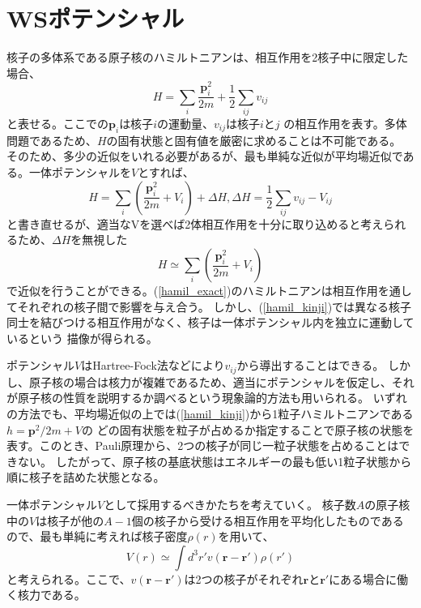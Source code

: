 \documentclass[a4paper,11pt]{jsreport}
\begin{document}
  \section{WSポテンシャル}
  核子の多体系である原子核のハミルトニアンは、相互作用を2核子中に限定した場合、
  \begin{equation}
    H=\sum_{i}\frac{\bm{p}_i^2}{2m} + \frac{1}{2}\sum_{ij}v_{ij}
  \end{equation}
  と表せる。ここでの\(\bm{p}_i\)は核子\(i\)の運動量、\(v_{ij}\)は核子\(i\)と\(j\)
  の相互作用を表す。多体問題であるため、\(H\)の固有状態と固有値を厳密に求めることは不可能である。
  そのため、多少の近似をいれる必要があるが、最も単純な近似が平均場近似である。一体ポテンシャルを\(V\)とすれば、
  \begin{equation*}
    H=\sum_{i}\left(\frac{\bm{p}_i^2}{2m}+V_i\right) +\Delta H,\Delta H = \frac{1}{2}\sum_{ij}v_{ij} - V_{ij}
    \label{hamil_exact}
  \end{equation*}
  と書き直せるが、適当なVを選べば2体相互作用を十分に取り込めると考えられるため、\(\Delta H\)を無視した
  \begin{equation}
    H \simeq \sum_{i}\left(\frac{\bm{p}_i^2}{2m}+V_i\right)
    \label{hamil_kinji}
  \end{equation}
  で近似を行うことができる。(\ref{hamil_exact})のハミルトニアンは相互作用を通してそれぞれの核子間で影響を与え合う。
  しかし、(\ref{hamil_kinji})では異なる核子同士を結びつける相互作用がなく、核子は一体ポテンシャル内を独立に運動しているという
  描像が得られる。\par
  ポテンシャル\(V\)はHartree-Fock法などにより\(v_{ij}\)から導出することはできる。
  しかし、原子核の場合は核力が複雑であるため、適当にポテンシャルを仮定し、それが原子核の性質を説明するか調べるという現象論的方法も用いられる。
  いずれの方法でも、平均場近似の上では(\ref{hamil_kinji})から1粒子ハミルトニアンである\(h=\bm{p}^2/2m+V\)の
  どの固有状態を粒子が占めるか指定することで原子核の状態を表す。このとき、Pauli原理から、2つの核子が同じ一粒子状態を占めることはできない。
  したがって、原子核の基底状態はエネルギーの最も低い1粒子状態から順に核子を詰めた状態となる。\par
  一体ポテンシャル\(V\)として採用するべきかたちを考えていく。
  核子数\(A\)の原子核中の\(V\)は核子が他の\(A-1\)個の核子から受ける相互作用を平均化したものであるので、最も単純に考えれば核子密度\(\rho(r)\)を用いて、
  \begin{equation*}
    V(r)\simeq\int d^3r' v(\bm{r}-\bm{r}')\rho(r')
  \end{equation*}
  と考えられる。ここで、\(v(\bm{r}-\bm{r}')\)は2つの核子がそれぞれ\(\bm{r}\)と\(\bm{r}'\)にある場合に働く核力である。
\end{document}
